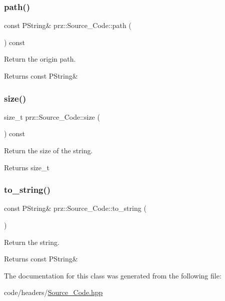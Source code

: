 \subsubsection{\texorpdfstring{path()}{path()}}
{\footnotesize\ttfamily const P\+String\& prz\+::\+Source\+\_\+\+Code\+::path (\begin{DoxyParamCaption}{ }\end{DoxyParamCaption}) const\hspace{0.3cm}{\ttfamily [inline]}}



Return the origin path. 

\begin{DoxyReturn}{Returns}
const P\+String\& 
\end{DoxyReturn}
\mbox{\label{classprz_1_1_source___code_a9b99d1ce7347c92b1815806c77dad122}} 
\subsubsection{\texorpdfstring{size()}{size()}}
{\footnotesize\ttfamily size\+\_\+t prz\+::\+Source\+\_\+\+Code\+::size (\begin{DoxyParamCaption}{ }\end{DoxyParamCaption}) const\hspace{0.3cm}{\ttfamily [inline]}}



Return the size of the string. 

\begin{DoxyReturn}{Returns}
size\+\_\+t 
\end{DoxyReturn}
\mbox{\label{classprz_1_1_source___code_a880bb787781f99a756fbc24bf97418b8}} 
\subsubsection{\texorpdfstring{to\_string()}{to\_string()}}
{\footnotesize\ttfamily const P\+String\& prz\+::\+Source\+\_\+\+Code\+::to\+\_\+string (\begin{DoxyParamCaption}{ }\end{DoxyParamCaption})\hspace{0.3cm}{\ttfamily [inline]}}



Return the string. 

\begin{DoxyReturn}{Returns}
const P\+String\& 
\end{DoxyReturn}


The documentation for this class was generated from the following file\+:\begin{DoxyCompactItemize}
\item 
code/headers/\mbox{\hyperlink{_source___code_8hpp}{Source\+\_\+\+Code.\+hpp}}\end{DoxyCompactItemize}
